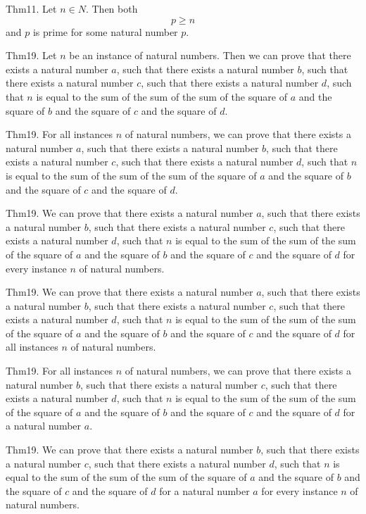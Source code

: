\documentclass{article}
\begin{document}
Thm11. Let $n \in N$. Then both $$p \geq n$$ and $p$ is prime for some natural number $p$.

Thm19. Let $n$ be an instance of natural numbers. Then we can prove that there exists a natural number $a$, such that there exists a natural number $b$, such that there exists a natural number $c$, such that there exists a natural number $d$, such that $n$ is equal to the sum of the sum of the sum of the square of $a$ and the square of $b$ and the square of $c$ and the square of $d$.

Thm19. For all instances $n$ of natural numbers, we can prove that there exists a natural number $a$, such that there exists a natural number $b$, such that there exists a natural number $c$, such that there exists a natural number $d$, such that $n$ is equal to the sum of the sum of the sum of the square of $a$ and the square of $b$ and the square of $c$ and the square of $d$.

Thm19. We can prove that there exists a natural number $a$, such that there exists a natural number $b$, such that there exists a natural number $c$, such that there exists a natural number $d$, such that $n$ is equal to the sum of the sum of the sum of the square of $a$ and the square of $b$ and the square of $c$ and the square of $d$ for every instance $n$ of natural numbers.

Thm19. We can prove that there exists a natural number $a$, such that there exists a natural number $b$, such that there exists a natural number $c$, such that there exists a natural number $d$, such that $n$ is equal to the sum of the sum of the sum of the square of $a$ and the square of $b$ and the square of $c$ and the square of $d$ for all instances $n$ of natural numbers.

Thm19. For all instances $n$ of natural numbers, we can prove that there exists a natural number $b$, such that there exists a natural number $c$, such that there exists a natural number $d$, such that $n$ is equal to the sum of the sum of the sum of the square of $a$ and the square of $b$ and the square of $c$ and the square of $d$ for a natural number $a$.

Thm19. We can prove that there exists a natural number $b$, such that there exists a natural number $c$, such that there exists a natural number $d$, such that $n$ is equal to the sum of the sum of the sum of the square of $a$ and the square of $b$ and the square of $c$ and the square of $d$ for a natural number $a$ for every instance $n$ of natural numbers.
\end{document}
